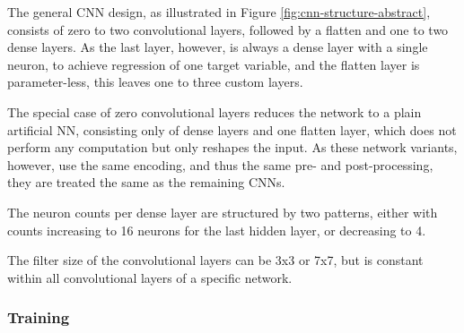 The general \gls{CNN} design, as illustrated in Figure \ref{fig:cnn-structure-abstract}, consists of zero to two convolutional layers, followed by a flatten and one to two dense layers. As the last layer, however, is always a dense layer with a single neuron, to achieve regression of one target variable, and the flatten layer is parameter-less, this leaves one to three custom layers. 

The special case of zero convolutional layers reduces the network to a plain artificial \gls{NN}, consisting only of dense layers and one flatten layer, which does not perform any computation but only reshapes the input. As these network variants, however, use the same encoding, and thus the same pre- and post-processing, they are treated the same as the remaining \glspl{CNN}.

The neuron counts per dense layer are structured by two patterns, either with counts increasing to 16 neurons for the last hidden layer, or decreasing to 4.

The filter size of the convolutional layers can be 3x3 or 7x7, but is constant within all convolutional layers of a specific network.

\subsubsection{Training}

